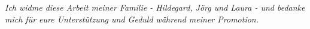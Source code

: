 
\begin{dedication} 

\textit{Ich widme diese Arbeit meiner Familie - Hildegard, J\"org und Laura - und bedanke mich f\"ur eure Unterst\"utzung und Geduld w\"ahrend meiner Promotion.}

\end{dedication}

